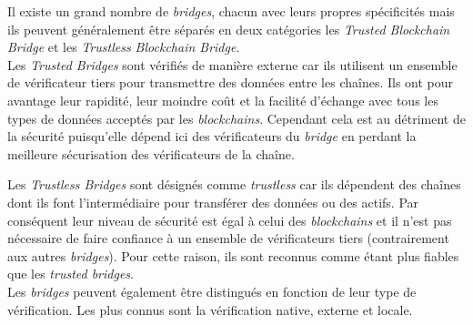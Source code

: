 Il existe un grand nombre de \textit{bridges}, chacun avec leurs propres spécificités mais ils peuvent généralement être séparés en deux catégories les \textit{Trusted Blockchain Bridge} et les \textit{Trustless Blockchain Bridge}. \\


Les \textit{Trusted Bridges} sont vérifiés de manière externe car ils utilisent un ensemble de vérificateur tiers pour transmettre des données entre les chaînes. Ils ont pour avantage leur rapidité, leur moindre coût et la facilité d'échange avec tous les types de données acceptés par les \textit{blockchains}. Cependant cela est au détriment de la sécurité puisqu'elle dépend ici des vérificateurs du \textit{bridge} en perdant la meilleure sécurisation des vérificateurs de la chaîne.\cite{EthereumBridges}

Les \textit{Trustless Bridges} sont désignés comme \textit{trustless} car ils dépendent des chaînes dont ils font l’intermédiaire pour transférer des données ou des actifs. Par conséquent leur niveau de sécurité est égal à celui des \textit{blockchains} et il n’est pas nécessaire de faire confiance à un ensemble de vérificateurs tiers (contrairement aux autres \textit{bridges}). Pour cette raison, ils sont reconnus comme étant plus fiables que les \textit{trusted bridges}.\cite{EthereumBridges}\\


 Les \textit{bridges} peuvent également être distingués en fonction de leur type de vérification. Les plus connus sont la vérification native, externe et locale.\cite{InteroperabilityBhuptani} \\

